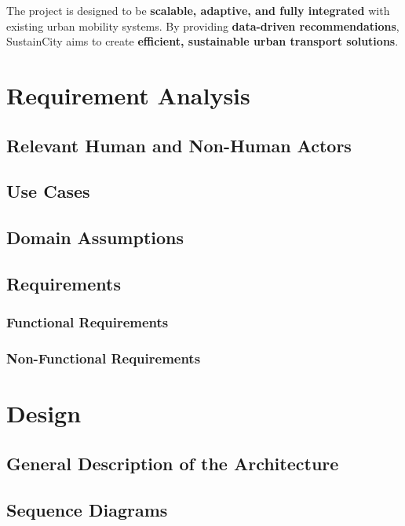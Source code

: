 \documentclass[a4paper,12pt]{article}
\begin{document}
The project is designed to be \textbf{scalable, adaptive, and fully integrated} with existing urban mobility systems. By providing \textbf{data-driven recommendations}, SustainCity aims to create \textbf{efficient, sustainable urban transport solutions}.

\newpage

\section{Requirement Analysis}

\subsection{Relevant Human and Non-Human Actors}

\subsection{Use Cases}


\subsection{Domain Assumptions}


\subsection{Requirements}
\subsubsection{Functional Requirements}

\subsubsection{Non-Functional Requirements}

\section{Design}
\subsection{General Description of the Architecture}

\subsection{Sequence Diagrams}
\end{document}
